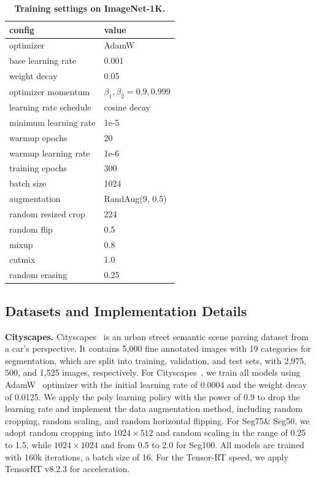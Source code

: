 \documentclass[letterpaper]{article} %
\begin{document}
\begin{table}[!h]
\begin{center}
\caption{\textbf{Training settings on ImageNet-1K.}}
\begin{tabular}{l|l}
\toprule
config & value \\
\hline
optimizer & AdamW \\
base learning rate & 0.001\\
weight decay & 0.05\\
optimizer momentum & $\beta_1, \beta_2{=}0.9, 0.999$ \\
learning rate schedule & cosine decay \\
minimum learning rate & 1e-5 \\
warmup epochs & 20 \\
warmup learning rate & 1e-6 \\
training epochs & 300  \\
batch size & 1024 \\
augmentation & RandAug(9, 0.5) \\
random resized crop & 224 \\
random flip & 0.5\\
mixup & 0.8 \\
cutmix & 1.0 \\
random erasing & 0.25 \\

\bottomrule
\end{tabular}
\vspace{-10pt}
\label{supp-tab:settings}
\end{center}
\end{table}

\subsection{Datasets and Implementation Details}
{\bf Cityscapes.} Cityscapes~\cite{cordts2016cityscapes} is an urban street semantic scene parsing dataset from a car's perspective. It contains 5,000 fine annotated images with 19 categories for segmentation, which are split into training, validation, and test sets, with 2,975, 500, and 1,525 images, respectively. For Cityscapes~\cite{cordts2016cityscapes}, we train all models using AdamW~\cite{loshchilov2017decoupled} optimizer with the initial learning rate of 0.0004 and the weight decay of 0.0125. We apply the poly learning policy with the power of 0.9 to drop the learning rate and implement the data augmentation method, including random cropping, random scaling, and random horizontal flipping. For Seg75\& Seg50, we adopt random cropping into $1024 \times 512$ and random scaling in the range of 0.25 to 1.5, while $1024 \times 1024$ and from 0.5 to 2.0 for Seg100. All models are trained with 160k iterations, a batch size of 16. For the Tensor-RT speed, we apply TensorRT v8.2.3 for acceleration.
\end{document}
